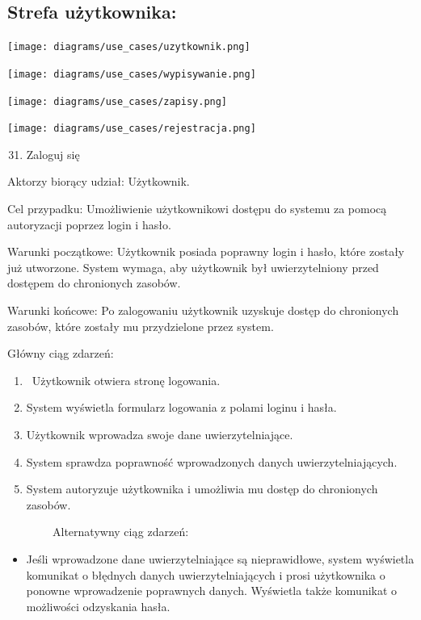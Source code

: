 \documentclass[
]{article}
\providecommand{\tightlist}{%
  \setlength{\itemsep}{0pt}\setlength{\parskip}{0pt}}
\begin{document}
{}

{}

{}

\hypertarget{h.53mnna977pi7}{%
\subsection{\texorpdfstring{{Strefa
użytkownika:}}{Strefa użytkownika:}}\label{h.53mnna977pi7}}

{\texttt{[image: diagrams/use\_cases/uzytkownik.png]}}

{\texttt{[image: diagrams/use\_cases/wypisywanie.png]}}

{\texttt{[image: diagrams/use\_cases/zapisy.png]}}

{\texttt{[image: diagrams/use\_cases/rejestracja.png]}}

\begin{enumerate}
\setcounter{enumi}{30}
\tightlist
\item
  {Zaloguj się}
\end{enumerate}

{Aktorzy biorący udział: Użytkownik.}

{Cel przypadku: Umożliwienie użytkownikowi dostępu do systemu za pomocą
autoryzacji poprzez login i hasło.}

{Warunki początkowe: Użytkownik posiada poprawny login i hasło, które
zostały już utworzone. System wymaga, aby użytkownik był uwierzytelniony
przed dostępem do chronionych zasobów.}

{Warunki końcowe: Po zalogowaniu użytkownik uzyskuje dostęp do
chronionych zasobów, które zostały mu przydzielone przez system.}

{Główny ciąg zdarzeń:}

\begin{enumerate}
\tightlist
\item
  {~Użytkownik otwiera stronę logowania.}
\item
  {System wyświetla formularz logowania z polami loginu i hasła.}
\item
  {Użytkownik wprowadza swoje dane uwierzytelniające.}
\item
  {System sprawdza poprawność wprowadzonych danych uwierzytelniających.}
\item
  {System autoryzuje użytkownika i umożliwia mu dostęp do chronionych
  zasobów.}
\end{enumerate}

{~~~~~~~~Alternatywny ciąg zdarzeń:}

\begin{itemize}
\tightlist
\item
  {Jeśli wprowadzone dane uwierzytelniające są nieprawidłowe, system
  wyświetla komunikat o błędnych danych uwierzytelniających i prosi
  użytkownika o ponowne wprowadzenie poprawnych danych. Wyświetla także
  komunikat o możliwości odzyskania hasła.\\
  \strut \\
  }
\end{itemize}
\end{document}
